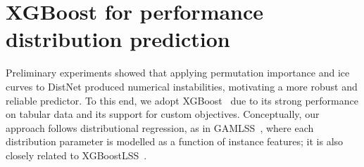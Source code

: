 \section{XGBoost for performance distribution prediction}
\label{sec:xgboost}

Preliminary experiments showed that applying permutation importance and \gls{ice} curves to DistNet produced numerical instabilities, motivating a more robust and reliable predictor.
To this end, we adopt XGBoost~\citep{CheGue16} due to its strong performance on tabular data and its support for custom objectives.
Conceptually, our approach follows distributional regression, as in GAMLSS~\citep{RigSta05}, where each distribution parameter is modelled as a function of instance features; it is also closely related to XGBoostLSS~\citep{Mrz2019}.

